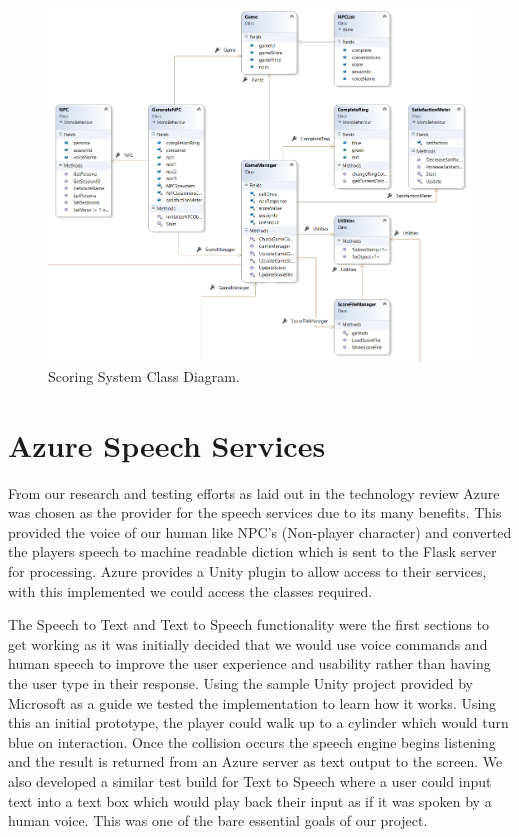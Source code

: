 \begin{figure}[h!]
	\caption{Scoring System Class Diagram.}
	\label{image:Scoring}
	\centering
	\includegraphics[width=1\textwidth]{Images/ClassDiagram Scoring.png}
\end{figure}

\newpage

\section{Azure Speech Services}
From our research and testing efforts as laid out in the technology review Azure was chosen as the provider for the speech services due to its many benefits. This provided the voice of our human like NPC's (Non-player character) and converted the players speech to machine readable diction which is sent to the Flask server for processing. Azure provides a Unity plugin to allow access to their services, with this implemented we could access the classes required.

\par
\medskip

The Speech to Text and Text to Speech functionality were the first sections to get working as it was initially decided that we would use voice commands and human speech to improve the user experience and usability rather than having the user type in their response. Using the sample Unity project provided by Microsoft as a guide we tested the implementation to learn how it works. Using this an initial prototype, the player could walk up to a cylinder which would turn blue on interaction. Once the collision occurs the speech engine begins listening and the result is returned from an Azure server as text output to the screen. We also developed a similar test build for Text to Speech where a user could input text into a text box which would play back their input as if it was spoken by a human voice. This was one of the bare essential goals of our project.

